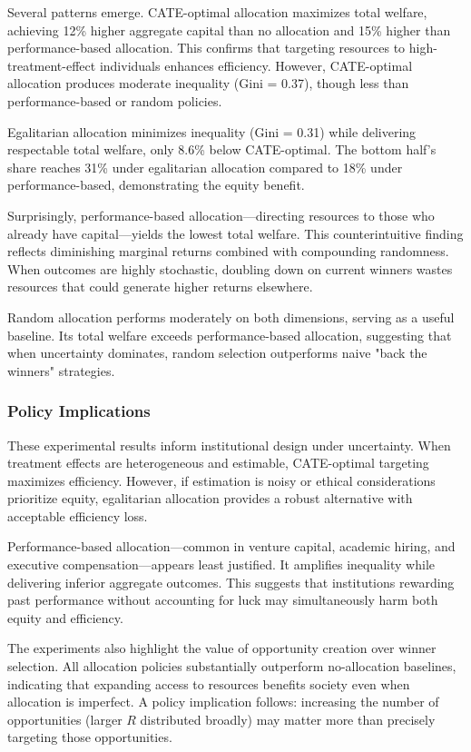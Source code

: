Several patterns emerge. CATE-optimal allocation maximizes total welfare,
achieving 12\% higher aggregate capital than no allocation and 15\% higher
than performance-based allocation. This confirms that targeting
resources to high-treatment-effect individuals enhances efficiency. However,
CATE-optimal allocation produces moderate inequality (Gini = 0.37), though
less than performance-based or random policies.

Egalitarian allocation minimizes inequality (Gini = 0.31) while delivering
respectable total welfare, only 8.6\% below CATE-optimal. The bottom
half's share reaches 31\% under egalitarian allocation compared to 18\%
under performance-based, demonstrating the equity benefit.

Surprisingly, performance-based allocation—directing resources to those
who already have capital—yields the lowest total welfare. This counterintuitive
finding reflects diminishing marginal returns combined with compounding randomness.
When outcomes are highly stochastic, doubling down on current winners wastes
resources that could generate higher returns elsewhere.

Random allocation performs moderately on both dimensions, serving as a
useful baseline. Its total welfare exceeds performance-based allocation,
suggesting that when uncertainty dominates, random selection outperforms
naive "back the winners" strategies.

\subsubsection{Policy Implications}

These experimental results inform institutional design under uncertainty.
When treatment effects are heterogeneous and estimable, CATE-optimal
targeting maximizes efficiency. However, if estimation is noisy or
ethical considerations prioritize equity, egalitarian allocation provides
a robust alternative with acceptable efficiency loss.

Performance-based allocation—common in venture capital, academic hiring,
and executive compensation—appears least justified. It amplifies
inequality while delivering inferior aggregate outcomes. This suggests that
institutions rewarding past performance without accounting for luck may simultaneously
harm both equity and efficiency.

The experiments also highlight the value of opportunity creation over winner
selection. All allocation policies substantially outperform no-allocation
baselines, indicating that expanding access to resources benefits society
even when allocation is imperfect. A policy implication follows: increasing
the number of opportunities (larger $R$ distributed broadly) may matter more
than precisely targeting those opportunities.

